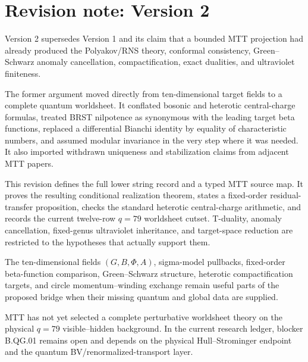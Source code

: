 \documentclass[11pt]{article}
\theoremstyle{definition}
\theoremstyle{remark}
\begin{document}
\section*{Revision note: Version 2}
\begin{description}[leftmargin=2.5cm,style=nextline]
\item[Supersedes]
Version 2 supersedes Version 1 and its claim that a bounded MTT projection had
already produced the Polyakov/RNS theory, conformal consistency,
Green--Schwarz anomaly cancellation, compactification, exact dualities, and
ultraviolet finiteness.

\item[Reason]
The former argument moved directly from ten-dimensional target fields to a
complete quantum worldsheet.  It conflated bosonic and heterotic
central-charge formulas, treated BRST nilpotence as synonymous with the
leading target beta functions, replaced a differential Bianchi identity by
equality of characteristic numbers, and assumed modular invariance in the
very step where it was needed.  It also imported withdrawn uniqueness and
stabilization claims from adjacent MTT papers.

\item[Resolution]
This revision defines the full lower string record and a typed MTT source map.
It proves the resulting conditional realization theorem, states a
fixed-order residual-transfer proposition, checks the standard heterotic
central-charge arithmetic, and records the current twelve-row \(q=79\)
worldsheet cutset.  T-duality, anomaly cancellation, fixed-genus ultraviolet
inheritance, and target-space reduction are restricted to the hypotheses
that actually support them.

\item[Retained content]
The ten-dimensional fields \((G,B,\Phi,A)\), sigma-model pullbacks,
fixed-order beta-function comparison, Green--Schwarz structure, heterotic
compactification targets, and circle momentum--winding exchange remain useful
parts of the proposed bridge when their missing quantum and global data are
supplied.

\item[Remaining boundary]
MTT has not yet selected a complete perturbative worldsheet theory on the
physical \(q=79\) visible--hidden background.  In the current research ledger,
blocker B.QG.01 remains open and depends on the physical Hull--Strominger
endpoint and the quantum BV/renormalized-transport layer.
\end{description}
\end{document}
